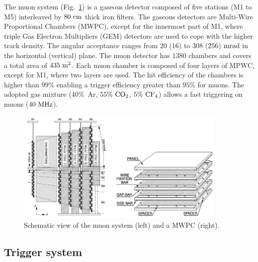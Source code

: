 The muon system \cite{MUON} (Fig.~\ref{fig:MUON}) is a gaseous detector composed of five stations (M1 to M5) interleaved by $80~\rm cm$ thick iron filters. The gaseous detectors are Multi-Wire Proportional Chambers (MWPC), except for the innermost part of M1, where triple Gas Electron Multipliers (GEM) detectors are used to cope with the higher track density. The angular acceptance ranges from $20$ ($16$) to $308$ ($256$) $\rm mrad$ in the horizontal (vertical) plane. The muon detector has $1380$ chambers and covers a total area of $435~\rm m^2$. Each muon chamber is composed of four layers of MPWC, except for M1, where two layers are used. The hit efficiency of the chambers is higher than $99\%$ enabling a trigger efficiency greater than $95\%$ for muons. The adopted gas mixture ($40\%$~Ar, $55\%~\rm CO_2$, $5\%~\rm CF_4$) allows a fast triggering on muons ($40~\rm MHz$).

\begin{figure}[t!]
  \begin{center}
    \includegraphics[width=0.9\textwidth]{02LHCb/figs/MUON.png}
  \end{center}
  \vspace{-2mm}
  \caption{Schematic view of the muon system (left) and a MWPC (right).}
  \label{fig:MUON}
\end{figure}

\subsection{Trigger system}

